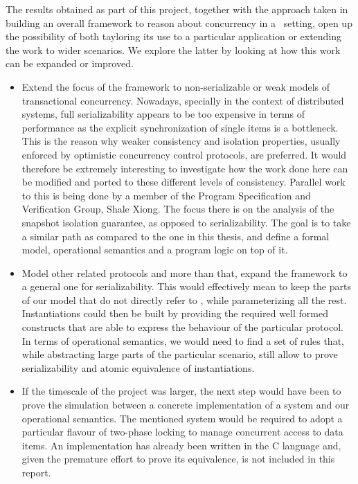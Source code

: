 The results obtained as part of this project, together with the approach taken in building an overall framework to reason about concurrency in a \tpl\ setting, open up the possibility of both tayloring its use to a particular application or extending the work to wider scenarios. We explore the latter by looking at how this work can be expanded or improved.
\begin{itemize}
	\item Extend the focus of the framework to non-serializable or weak models of transactional concurrency. Nowadays, specially in the context of distributed systems, full serializability appears to be too expensive in terms of performance as the explicit synchronization of single items is a bottleneck. This is the reason why weaker consistency and isolation properties, usually enforced by optimistic concurrency control protocols, are preferred. It would therefore be extremely interesting to investigate how the work done here can be modified and ported to these different levels of consistency.  Parallel work to this is being done by a member of the Program Specification and Verification Group, Shale Xiong. The focus there is on the analysis of the snapshot isolation guarantee, as opposed to serializability. The goal is to take a similar path as compared to the one in this thesis, and define a formal model, operational semantics and a program logic on top of it.
	
	\item Model other related protocols and more than that, expand the framework to a general one for serializability. This would effectively mean to keep the parts of our model that do not directly refer to \tpl, while parameterizing all the rest. Instantiations could then be built by providing the required well formed constructs that are able to express the behaviour of the particular protocol. In terms of operational semantics, we would need to find a set of rules that, while abstracting large parts of the particular scenario, still allow to prove serializability and atomic equivalence of instantiations.
	
	\item If the timescale of the project was larger, the next step would have been to prove the simulation between a concrete implementation of a system and our operational semantics. The mentioned system would be required to adopt a particular flavour of two-phase locking to manage concurrent access to data items. An implementation has already been written in the C language and, given the premature effort to prove its equivalence, is not included in this report.
	

\end{itemize}
